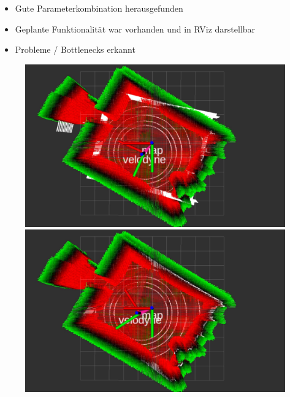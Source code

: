 \documentclass{beamer}
\begin{document}
\begin{frame}{\subsecname}
\begin{itemize}
\item Gute Parameterkombination herausgefunden
\item Geplante Funktionalität war vorhanden und in RViz darstellbar
\item Probleme / Bottlenecks erkannt
\end{itemize}
\begin{figure}
    \includegraphics[width=\linewidth]{images/demo1.jpg}
\endminipage\hfill
{}
    \includegraphics[width=\linewidth]{images/demo2.jpg}
\endminipage\hfill
\end{figure}
\end{frame}
\end{document}
